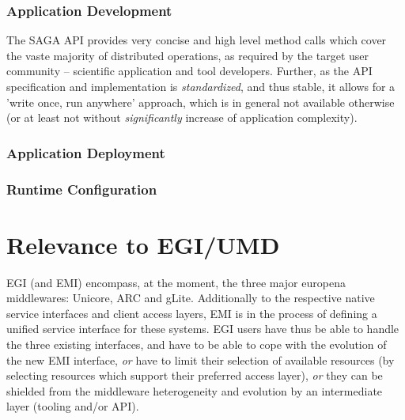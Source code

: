 \documentclass[12pt]{article}
\newcommand{\I}[1]{\textit{#1}}
\begin{document}
 \subsubsection*{Application Development}


  The SAGA API provides very concise and high level method calls which
  cover the vaste majority of distributed operations, as required by
  the target user community -- scientific application and tool
  developers.  Further, as the API specification and implementation is
  \I{standardized}, and thus stable, it allows for a 'write once, run
  anywhere' approach, which is in general not available otherwise (or
  at least not without \I{significantly} increase of application
  complexity).

\subsubsection*{Application Deployment}

\subsubsection*{Runtime Configuration}

   
\section{Relevance to EGI/UMD}

 EGI (and EMI) encompass, at the moment, the three major europena
 middlewares: Unicore, ARC and gLite.  Additionally to the respective
 native service interfaces and client access layers, EMI is in the
 process of defining a unified service interface for these systems.
 EGI users have thus be able to handle the three existing interfaces,
 and have to be able to cope with the evolution of the new EMI
 interface, \I{or} have to limit their selection of available
 resources (by selecting resources which support their preferred
 access layer), \I{or} they can be shielded from the middleware
 heterogeneity and evolution by an intermediate layer (tooling and/or
 API).  
 
\end{document}
